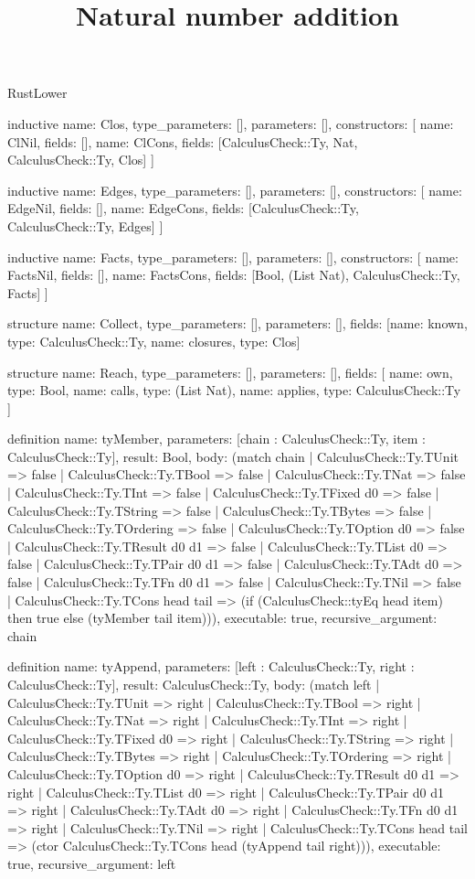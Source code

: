 \begin{lexlean}{RustLower}
\title{Natural number addition}
\begin{semanticmodule}
inductive{
  name: Clos,
  type_parameters: [],
  parameters: [],
  constructors: [
    {name: ClNil, fields: []},
    {name: ClCons, fields: [CalculusCheck::Ty, Nat, CalculusCheck::Ty, Clos]}
  ]
}

inductive{
  name: Edges,
  type_parameters: [],
  parameters: [],
  constructors: [
    {name: EdgeNil, fields: []},
    {name: EdgeCons, fields: [CalculusCheck::Ty, CalculusCheck::Ty, Edges]}
  ]
}

inductive{
  name: Facts,
  type_parameters: [],
  parameters: [],
  constructors: [
    {name: FactsNil, fields: []},
    {name: FactsCons, fields: [Bool, (List Nat), CalculusCheck::Ty, Facts]}
  ]
}

structure{
  name: Collect,
  type_parameters: [],
  parameters: [],
  fields: [{name: known, type: CalculusCheck::Ty}, {name: closures, type: Clos}]
}

structure{
  name: Reach,
  type_parameters: [],
  parameters: [],
  fields: [
    {name: own, type: Bool},
    {name: calls, type: (List Nat)},
    {name: applies, type: CalculusCheck::Ty}
  ]
}

definition{
  name: tyMember,
  parameters: [chain : CalculusCheck::Ty, item : CalculusCheck::Ty],
  result: Bool,
  body: (match chain
    | CalculusCheck::Ty.TUnit => false
    | CalculusCheck::Ty.TBool => false
    | CalculusCheck::Ty.TNat => false
    | CalculusCheck::Ty.TInt => false
    | CalculusCheck::Ty.TFixed d0 => false
    | CalculusCheck::Ty.TString => false
    | CalculusCheck::Ty.TBytes => false
    | CalculusCheck::Ty.TOrdering => false
    | CalculusCheck::Ty.TOption d0 => false
    | CalculusCheck::Ty.TResult d0 d1 => false
    | CalculusCheck::Ty.TList d0 => false
    | CalculusCheck::Ty.TPair d0 d1 => false
    | CalculusCheck::Ty.TAdt d0 => false
    | CalculusCheck::Ty.TFn d0 d1 => false
    | CalculusCheck::Ty.TNil => false
    | CalculusCheck::Ty.TCons head tail => (if (CalculusCheck::tyEq head item) then true else (tyMember tail item))),
  executable: true,
  recursive_argument: chain
}

definition{
  name: tyAppend,
  parameters: [left : CalculusCheck::Ty, right : CalculusCheck::Ty],
  result: CalculusCheck::Ty,
  body: (match left
    | CalculusCheck::Ty.TUnit => right
    | CalculusCheck::Ty.TBool => right
    | CalculusCheck::Ty.TNat => right
    | CalculusCheck::Ty.TInt => right
    | CalculusCheck::Ty.TFixed d0 => right
    | CalculusCheck::Ty.TString => right
    | CalculusCheck::Ty.TBytes => right
    | CalculusCheck::Ty.TOrdering => right
    | CalculusCheck::Ty.TOption d0 => right
    | CalculusCheck::Ty.TResult d0 d1 => right
    | CalculusCheck::Ty.TList d0 => right
    | CalculusCheck::Ty.TPair d0 d1 => right
    | CalculusCheck::Ty.TAdt d0 => right
    | CalculusCheck::Ty.TFn d0 d1 => right
    | CalculusCheck::Ty.TNil => right
    | CalculusCheck::Ty.TCons head tail => (ctor CalculusCheck::Ty.TCons head (tyAppend tail right))),
  executable: true,
  recursive_argument: left
}


\end{semanticmodule}
\end{lexlean}
